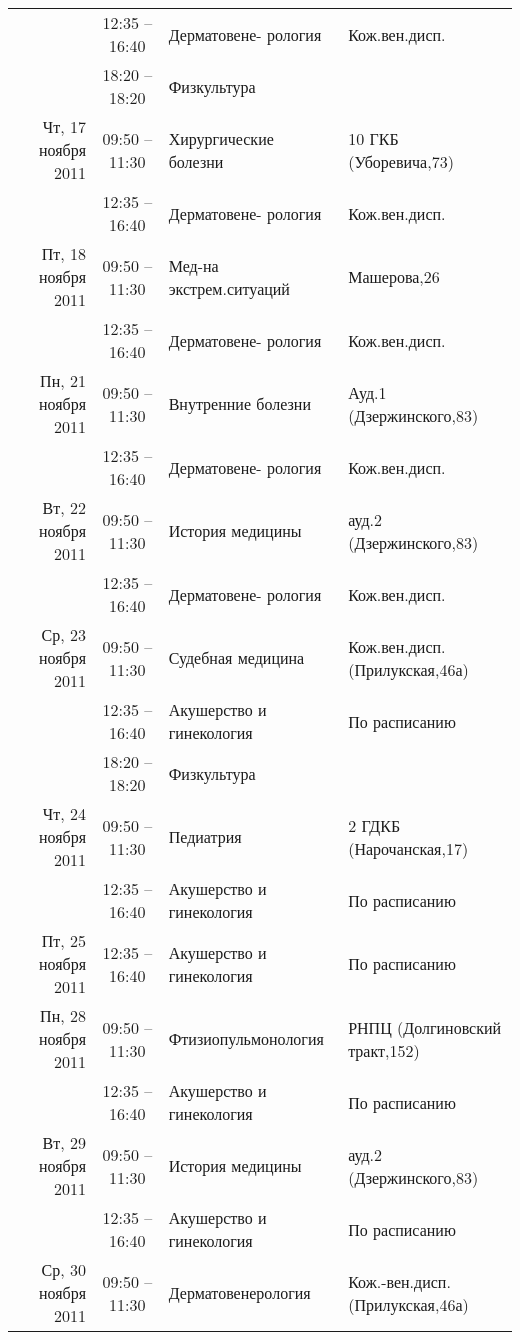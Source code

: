\documentclass[a4paper,10pt,notitlepage]{report}
\begin{document}
\begin{center}
{\begin{longtable}{r|c|l|l|}
  & 12:35 -- 16:40 & Дерматовене- рология & Кож.вен.дисп. \\ \cline{2-4}
  & 18:20 -- 18:20 & Физкультура &  \\ \cline{2-4}
\hline Чт, 17 ноября 2011
  & 09:50 -- 11:30 & Хирургические болезни & 10 ГКБ (Уборевича,73) \\ \cline{2-4}
  & 12:35 -- 16:40 & Дерматовене- рология & Кож.вен.дисп. \\ \cline{2-4}
\hline Пт, 18 ноября 2011
  & 09:50 -- 11:30 & Мед-на экстрем.ситуаций & Машерова,26 \\ \cline{2-4}
  & 12:35 -- 16:40 & Дерматовене- рология & Кож.вен.дисп. \\ \cline{2-4}
\hline Пн, 21 ноября 2011
  & 09:50 -- 11:30 & Внутренние болезни & Ауд.1 (Дзержинского,83) \\ \cline{2-4}
  & 12:35 -- 16:40 & Дерматовене- рология & Кож.вен.дисп. \\ \cline{2-4}
\hline Вт, 22 ноября 2011
  & 09:50 -- 11:30 & История медицины & ауд.2 (Дзержинского,83) \\ \cline{2-4}
  & 12:35 -- 16:40 & Дерматовене- рология & Кож.вен.дисп. \\ \cline{2-4}
\hline Ср, 23 ноября 2011
  & 09:50 -- 11:30 & Судебная медицина & Кож.вен.дисп.(Прилукская,46а) \\ \cline{2-4}
  & 12:35 -- 16:40 & Акушерство и гинекология & По расписанию \\ \cline{2-4}
  & 18:20 -- 18:20 & Физкультура &  \\ \cline{2-4}
\hline Чт, 24 ноября 2011
  & 09:50 -- 11:30 & Педиатрия & 2 ГДКБ (Нарочанская,17) \\ \cline{2-4}
  & 12:35 -- 16:40 & Акушерство и гинекология & По расписанию \\ \cline{2-4}
\hline Пт, 25 ноября 2011
  & 12:35 -- 16:40 & Акушерство и гинекология & По расписанию \\ \cline{2-4}
\hline Пн, 28 ноября 2011
  & 09:50 -- 11:30 & Фтизиопульмонология & РНПЦ (Долгиновский тракт,152) \\ \cline{2-4}
  & 12:35 -- 16:40 & Акушерство и гинекология & По расписанию \\ \cline{2-4}
\hline Вт, 29 ноября 2011
  & 09:50 -- 11:30 & История медицины & ауд.2 (Дзержинского,83) \\ \cline{2-4}
  & 12:35 -- 16:40 & Акушерство и гинекология & По расписанию \\ \cline{2-4}
\hline Ср, 30 ноября 2011
  & 09:50 -- 11:30 & Дерматовенерология & Кож.-вен.дисп.(Прилукская,46а) \\ \cline{2-4}

\end{longtable}}
\end{center}
\end{document}
